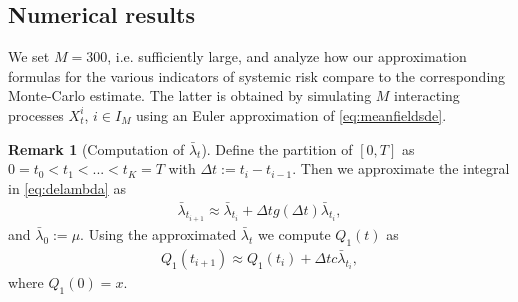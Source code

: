 \documentclass[10pt]{article}
\theoremstyle{plain}
\theoremstyle{definition}
\newtheorem{remark}[theorem]{Remark}
\newcommand{\<}{\langle}
\renewcommand{\>}{\rangle}
\renewcommand{\(}{\left(}
\renewcommand{\)}{\right)}
\renewcommand{\[}{\left[}
\renewcommand{\]}{\right]}
\begin{document}
\subsection{Numerical results}
We set $M = 300$, i.e. sufficiently large, and analyze how our approximation formulas for the various indicators of systemic risk compare to the corresponding
Monte-Carlo estimate. The latter is obtained by simulating $M$ interacting processes $X_t^i$, $i\in I_M$ using an Euler approximation of \eqref{eq:meanfieldsde}.
\begin{remark}[Computation of $\bar \lambda_t$] Define the partition of $[0,T]$ as $0=t_0<t_1<...<t_K=T$ with $\Delta t:=t_{i}-t_{i-1}$. Then we approximate the integral in \eqref{eq:delambda} as
\begin{align}
\bar\lambda_{t_{i+1}} \approx \bar\lambda_{t_{i}} + \Delta t g(\Delta t)\bar\lambda_{t_{i}},
\end{align}
and $\bar \lambda_0:=\mu$. Using the approximated $\bar\lambda_t$ we compute $Q_1(t)$ as
\begin{align}
Q_1(t_{i+1}) \approx Q_1(t_i) + \Delta t c\bar \lambda_{t_{i}},
\end{align}
where $Q_1(0) = x$.
\end{remark}
\end{document}

